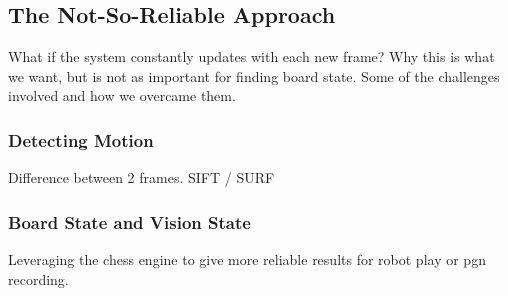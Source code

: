 \subsection{The Not-So-Reliable Approach}
What if the system constantly updates with each new frame?
Why this is what we want, but is not as important for finding board state.
Some of the challenges involved and how we overcame them.

\subsubsection{Detecting Motion}
Difference between 2 frames.
SIFT / SURF

\subsubsection{Board State and Vision State}
Leveraging the chess engine to give more reliable results for robot play or pgn recording.